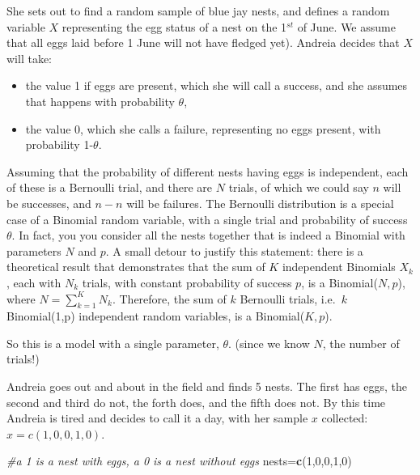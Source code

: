 \documentclass[
]{book}
\newenvironment{Shaded}{\begin{snugshade}}{\end{snugshade}}
\newcommand{\CommentTok}[1]{\textcolor[rgb]{0.56,0.35,0.01}{\textit{#1}}}
\newcommand{\DecValTok}[1]{\textcolor[rgb]{0.00,0.00,0.81}{#1}}
\newcommand{\KeywordTok}[1]{\textcolor[rgb]{0.13,0.29,0.53}{\textbf{#1}}}
\newcommand{\NormalTok}[1]{#1}
\providecommand{\tightlist}{%
  \setlength{\itemsep}{0pt}\setlength{\parskip}{0pt}}
\begin{document}
She sets out to find a random sample of blue jay nests, and defines a random variable \(X\) representing the egg status of a nest on the 1\(^{st}\) of June. We assume that all eggs laid before 1 June will not have fledged yet). Andreia decides that \(X\) will take:

\begin{itemize}
\tightlist
\item
  the value 1 if eggs are present, which she will call a success, and she assumes that happens with probability \(\theta\),
\item
  the value 0, which she calls a failure, representing no eggs present, with probability 1-\(\theta\).
\end{itemize}

Assuming that the probability of different nests having eggs is independent, each of these is a Bernoulli trial, and there are \(N\) trials, of which we could say \(n\) will be successes, and \(n-n\) will be failures. The Bernoulli distribution is a special case of a Binomial random variable, with a single trial and probability of success \(\theta\). In fact, you you consider all the nests together that is indeed a Binomial with parameters \(N\) and \(p\). A small detour to justify this statement: there is a theoretical result that demonstrates that the sum of \(K\) independent Binomials \(X_k\), each with \(N_k\) trials, with constant probability of success \(p\), is a Binomial(\(N,p\)), where \(N=\sum_{k=1}^K N_k\). Therefore, the sum of \(k\) Bernoulli trials, i.e.~\(k\) Binomial(1,p) independent random variables, is a Binomial(\(K,p\)).

So this is a model with a single parameter, \(\theta\). (since we know \(N\), the number of trials!)

Andreia goes out and about in the field and finds 5 nests. The first has eggs, the second and third do not, the forth does, and the fifth does not. By this time Andreia is tired and decides to call it a day, with her sample \(x\) collected: \(x=c(1,0,0,1,0)\).

\begin{Shaded}
\begin{Highlighting}[]
\CommentTok{#a 1 is a nest with eggs, a 0 is a nest without eggs}
\NormalTok{nests=}\KeywordTok{c}\NormalTok{(}\DecValTok{1}\NormalTok{,}\DecValTok{0}\NormalTok{,}\DecValTok{0}\NormalTok{,}\DecValTok{1}\NormalTok{,}\DecValTok{0}\NormalTok{)}
\end{Highlighting}
\end{Shaded}
\end{document}
